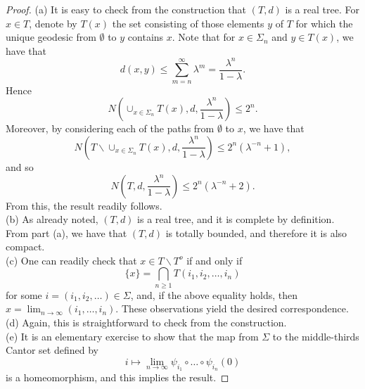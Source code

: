 \documentclass[a4paper, 11pt]{article}
\begin{document}
\begin{proof}
(a) It is easy to check from the construction that $(T,d)$ is a real tree. For $x\in T$, denote by $T(x)$ the set consisting of those elements $y$ of $T$ for which the unique geodesic from $\emptyset$ to $y$ contains $x$. Note that for $x\in \Sigma_n$ and $y\in T(x)$, we have that
\begin{equation}\label{dxy}
d(x,y)\leq \sum_{m=n}^\infty\lambda^m=\frac{\lambda^n}{1-\lambda}.
\end{equation}
Hence
\[N\left(\cup_{x\in\Sigma_n}T(x),d,\frac{\lambda^n}{1-\lambda}\right)\leq 2^n.\]
Moreover, by considering each of the paths from $\emptyset$ to $x$, we have that
\[N\left(T\backslash\cup_{x\in\Sigma_n}T(x),d,\frac{\lambda^n}{1-\lambda}\right)\leq 2^n\left(\lambda^{-n} +1\right),\]
and so
\[N\left(T,d,\frac{\lambda^n}{1-\lambda}\right)\leq 2^n\left(\lambda^{-n} +2\right).\]
From this, the result readily follows.\\
(b) As already noted, $(T,d)$ is a real tree, and it is complete by definition. From part (a), we have that $(T,d)$ is totally bounded, and therefore it is also compact.\\
(c) One can readily check that $x\in T\backslash T^o$ if and only if
\[\{x\}=\bigcap_{n\geq 1}T(i_1,i_2,\dots,i_n)\]
for some $i=(i_1,i_2,\dots)\in \Sigma$, and, if the above equality holds, then $x=\lim_{n\rightarrow\infty}(i_1,\dots,i_n)$. These observations yield the desired correspondence.\\
(d) Again, this is straightforward to check from the construction.\\
(e) It is an elementary exercise to show that the map from $\Sigma$ to the middle-thirds Cantor set defined by
\begin{equation}\label{ilim}
i\mapsto \lim_{n\rightarrow\infty}\psi_{i_1}\circ\dots\circ\psi_{i_n}(0)
\end{equation}
is a homeomorphism, and this implies the result.
\end{proof}
\end{document}
